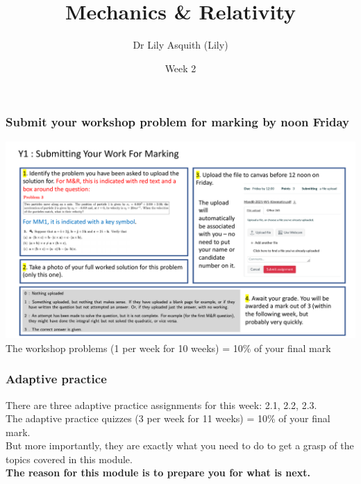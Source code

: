 


% 
\title[ Mechanics \& Relativity]{Mechanics \& Relativity}
\author[Dr Lily Asquith (Lily)]{ Dr Lily Asquith (Lily)}
\date[Week 2]{Week 2}





\begin{frame}
\titlepage
\end{frame} 


\begin{frame}
\frametitle{Submit your workshop problem for marking by noon Friday}
\includegraphics[scale=0.34]{Y1-2021-submission-guide.pdf}
The workshop problems (1 per week for 10 weeks) = 10\% of your final mark\\[1ex]
\end{frame} 

\begin{frame}
\frametitle{Adaptive practice}
There are three adaptive practice assignments for this week: 2.1, 2.2, 2.3.\\[1ex]
The adaptive practice quizzes (3 per week for 11 weeks) = 10\% of your final mark.\\[1ex]
But more importantly, they are exactly what you need to do to get a grasp of the topics covered in this module.\\[1ex]
\textbf{The reason for this module is to prepare you for what is next.}\\

\end{frame} 



